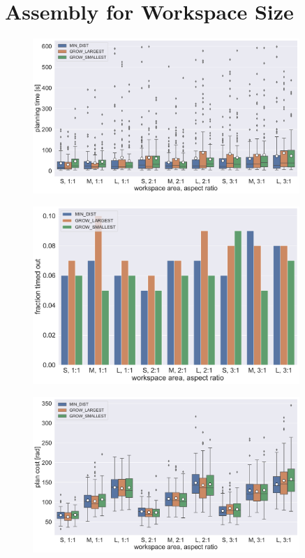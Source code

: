 \section{Assembly for Workspace Size}

\begin{figure}
	\centering
	\includegraphics[width=0.9\textwidth]{figures/plots/AFBS_time.pdf}
	\caption[]{}
	\label{fig:AFBS_time}
\end{figure}

\begin{figure}
	\centering
	\includegraphics[width=0.9\textwidth]{figures/plots/AFBS_timeout.pdf}
	\caption[]{}
	\label{fig:AFBS_timeout}
\end{figure}

\begin{figure}
	\centering
	\includegraphics[width=0.9\textwidth]{figures/plots/AFBS_cost.pdf}
	\caption[]{}
	\label{fig:AFBS_cost}
\end{figure}



